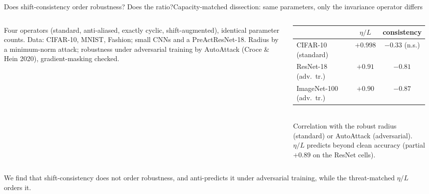 \documentclass[aspectratio=169,10pt]{beamer}
\newcommand{\etaL}{\ensuremath{\eta/L}}
\newcommand{\tb}[1]{{\color{TUMblue}#1}}
\newcommand{\good}[1]{{\color{good}#1}}
\newcommand{\bad}[1]{{\color{bad}#1}}
\begin{document}
\begin{frame}{Does shift-consistency order robustness? Does the ratio?}{Capacity-matched dissection: same parameters, only the invariance operator differs}
  \vspace{0.2em}
  \begin{columns}[T]
    \begin{column}{0.52\textwidth}
      {\footnotesize Four operators (standard, anti-aliased, exactly cyclic, shift-augmented), identical
      parameter counts. Data: CIFAR-10, MNIST, Fashion; small CNNs and a PreActResNet-18. Radius by a
      minimum-norm attack; robustness under adversarial training by AutoAttack \tb{(Croce \& Hein 2020)},
      gradient-masking checked.}
    \end{column}
    \begin{column}{0.46\textwidth}
      \centering\footnotesize
      \begin{tabular}{lcc}
        \toprule
        & \good{$\etaL$} & \bad{consistency}\\
        \midrule
        CIFAR-10 (standard) & $+0.998$ & $-0.33$ (n.s.)\\
        ResNet-18 (adv.\ tr.) & $+0.91$ & $-0.81$\\
        ImageNet-100 (adv.\ tr.) & $+0.90$ & $-0.87$\\
        \bottomrule
      \end{tabular}\\[0.4em]
      {\scriptsize\color{slate} Correlation with the robust radius (standard) or AutoAttack (adversarial).
      $\etaL$ predicts beyond clean accuracy (partial $+0.89$ on the ResNet cells).}
    \end{column}
  \end{columns}
  \vspace{0.2em}
  {\footnotesize We find that shift-consistency does not order robustness, and anti-predicts it under
  adversarial training, while the threat-matched $\etaL$ orders it.}
\end{frame}
\end{document}
